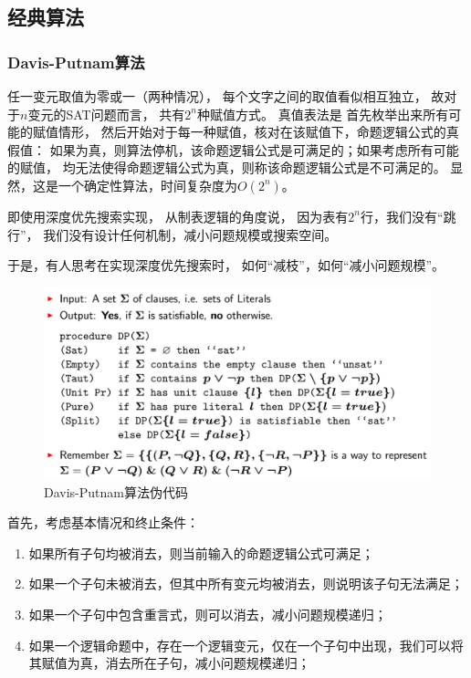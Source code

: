 \documentclass[12pt]{ctexart}
\begin{document}
\subsection{经典算法}

\subsubsection{Davis-Putnam算法}

任一变元取值为零或一（两种情况），
每个文字之间的取值看似相互独立，
故对于$n$变元的SAT问题而言，
共有$2^n$种赋值方式。
真值表法是
首先枚举出来所有可能的赋值情形，
然后开始对于每一种赋值，核对在该赋值下，命题逻辑公式的真假值：
如果为真，则算法停机，该命题逻辑公式是可满足的；如果考虑所有可能的赋值，
均无法使得命题逻辑公式为真，则称该命题逻辑公式是不可满足的。
显然，这是一个确定性算法，时间复杂度为$O(2^n)$。

即使用深度优先搜索实现，
从制表逻辑的角度说，
因为表有$2^n$行，我们没有“跳行”，
我们没有设计任何机制，减小问题规模或搜索空间。

于是，有人思考在实现深度优先搜索时，
如何“减枝”，如何“减小问题规模”。

\begin{figure}[htbp]
    \centering
    \includegraphics[width=0.9\linewidth]{dp.png}
    \caption{Davis-Putnam算法伪代码}
\end{figure}

首先，考虑基本情况和终止条件：
\begin{enumerate}
    \item 如果所有子句均被消去，则当前输入的命题逻辑公式可满足；
    \item 如果一个子句未被消去，但其中所有变元均被消去，则说明该子句无法满足；
    \item 如果一个子句中包含重言式，则可以消去，减小问题规模递归；
    \item 如果一个逻辑命题中，存在一个逻辑变元，仅在一个子句中出现，我们可以将其赋值为真，消去所在子句，减小问题规模递归；
\end{enumerate}
\end{document}
